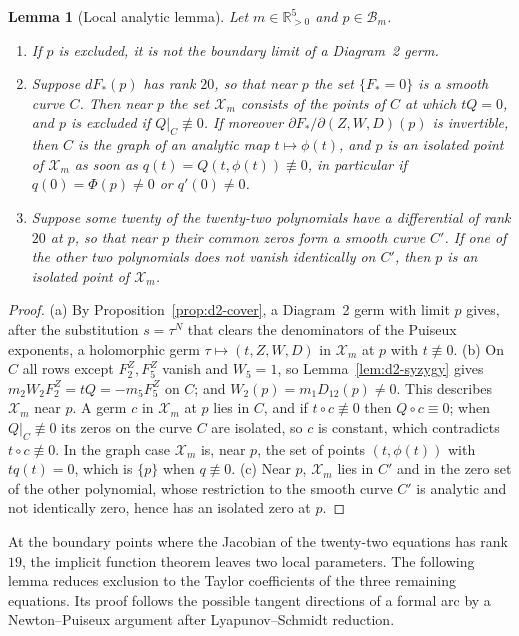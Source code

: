 \documentclass[Threeside,11pt]{article}
\newtheorem{lemma}[theorem]{Lemma}
\theoremstyle{definition}
\theoremstyle{remark}
\numberwithin{equation}{section}
\theoremstyle{remark}
\newcommand{\Rp}{\mathbb{R}_{>0}}
\newenvironment{alphalist}{\begin{enumerate}\renewcommand{\labelenumi}{(\alph{enumi})}%
  \renewcommand{\theenumi}{\alph{enumi}}}{\end{enumerate}}
\begin{document}
\begin{lemma}[Local analytic lemma]\label{lem:d2-isolation}
Let $m\in\Rp^5$ and $p\in\mathcal B_m$.
\begin{alphalist}
  \item If $p$ is excluded, it is not the boundary limit of a Diagram~2 germ.
  \item Suppose $dF_*(p)$ has rank $20$, so that near $p$ the set
  $\{F_*=0\}$ is a smooth curve $C$.  Then near $p$ the set $\mathcal X_m$ consists of the
  points of $C$ at which $tQ=0$, and $p$ is excluded if $Q|_C\not\equiv0$.  If moreover
  $\partial F_*/\partial(Z,W,D)(p)$ is invertible, then $C$ is the graph of an
  analytic map $t\mapsto\phi(t)$, and $p$ is an isolated point of $\mathcal X_m$ as soon as
  $q(t)=Q(t,\phi(t))\not\equiv0$, in particular if $q(0)=\Phi(p)\ne0$ or $q'(0)\ne0$.
  \item Suppose some twenty of the twenty-two polynomials have a differential of rank $20$ at
  $p$, so that near $p$ their common zeros form a smooth curve $C'$.  If one of the other two
  polynomials does not vanish identically on $C'$, then $p$ is an isolated point of $\mathcal X_m$.
\end{alphalist}
\end{lemma}

\begin{proof}
(a) By Proposition~\ref{prop:d2-cover}, a Diagram~2 germ with limit $p$ gives, after the
substitution $s=\tau^N$ that clears the denominators of the Puiseux exponents, a holomorphic germ
$\tau\mapsto(t,Z,W,D)$ in $\mathcal X_m$ at $p$ with $t\not\equiv0$.
(b) On $C$ all rows except $F^Z_2,F^Z_5$ vanish and $W_5=1$, so Lemma~\ref{lem:d2-syzygy} gives
$m_2W_2F^Z_2=tQ=-m_5F^Z_5$ on $C$; and $W_2(p)=m_1D_{12}(p)\ne0$.  This describes $\mathcal X_m$
near $p$.  A germ $c$ in $\mathcal X_m$ at $p$ lies in $C$, and if $t\circ c\not\equiv0$ then
$Q\circ c\equiv0$; when
$Q|_C\not\equiv0$ its zeros on the curve $C$ are isolated, so $c$ is constant, which contradicts
$t\circ c\not\equiv0$.  In the graph case $\mathcal X_m$ is, near $p$, the set of points $(t,\phi(t))$ with
$tq(t)=0$, which is $\{p\}$ when $q\not\equiv0$.
(c) Near $p$, $\mathcal X_m$ lies in $C'$ and in the zero set of the other polynomial, whose restriction
to the smooth curve $C'$ is analytic and not identically zero, hence has an isolated zero at $p$.
\end{proof}

{At the boundary points where the Jacobian of the twenty-two equations has rank
$19$, the implicit function theorem leaves two local parameters.  The following lemma
reduces exclusion to the Taylor coefficients of the three remaining equations.
Its proof follows the possible tangent directions of a formal arc by a Newton--Puiseux
argument after Lyapunov--Schmidt reduction.}
\end{document}

